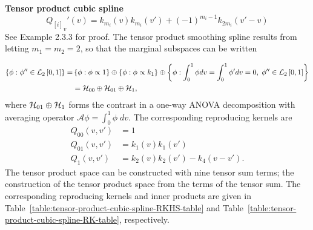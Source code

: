 \begin{example}{\textbf {Tensor product cubic spline}}
\begin{equation}
{Q_{\left[i\right]} }_v'\left(v\right) = k_{m_i}\left(v\right)k_{m_i}\left(v'\right) + \left(-1\right)^{m_i-1}k_{2m_i}\left(v' - v\right)
\end{equation}
\noindent
See \cite{gu2002smoothing} Example 2.3.3 for proof. The tensor product smoothing spline results from letting $m_1 = m_2 = 2$, so that the marginal subspaces can be written

\begin{align} \label{eq:cubic-spline-hilbert-space}
\left\{ \phi: \phi'' \in \mathcal{L}_2\left[0,1\right] \right\} = &\left\{ \phi: \phi \propto 1 \right\} \oplus  \left\{ \phi: \phi \propto k_1 \right\} \oplus \left\{ \phi: \int_0^1 \phi dv = \int_0^1 \phi' dv = 0,\; \phi'' \in \mathcal{L}_2\left[0,1\right]  \right\} \\
&= \mathcal{H}_{00} \oplus \mathcal{H}_{01} \oplus \mathcal{H}_1,
\end{align}
\noindent
where $ \mathcal{H}_{01} \oplus \mathcal{H}_1$ forms the contrast in a one-way ANOVA decomposition with averaging operator $\mathcal{A}\phi = \int_0^1 \phi\;dv$. The corresponding reproducing kernels are
\begin{align} \label{eq:cubic-spline-hilbert-space-rks}
Q_{00}\left(v,v'\right) &= 1\\
Q_{01}\left(v,v'\right) &= k_1\left(v\right)k_1\left(v'\right)\\
Q_{1}\left(v,v'\right) &= k_2\left(v\right)k_2\left(v'\right) - k_4\left(v-v'\right).
\end{align}
\noindent
The tensor product space can be constructed with nine tensor sum terms; the construction of the tensor product space from the terms of the tensor sum. The corresponding reproducing kernels and inner products are given in Table~\ref{table:tensor-product-cubic-spline-RKHS-table} and Table~\ref{table:tensor-product-cubic-spline-RK-table}, respectively.


\end{example}

